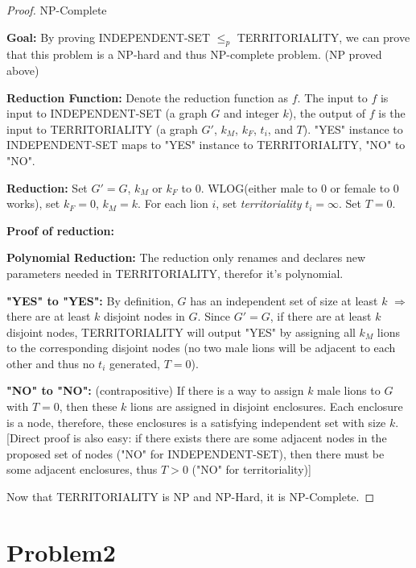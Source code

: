 \documentclass[openany]{article}
\begin{document}
\begin{proof}{NP-Complete}



\textbf{Goal:} By proving INDEPENDENT-SET $\leqslant_p$ TERRITORIALITY, we can prove that this problem is a NP-hard and thus NP-complete problem. (NP proved above)

\textbf{Reduction Function:} Denote the reduction function as $f$. The input to $f$ is input to INDEPENDENT-SET (a graph $G$ and integer $k$), the output of $f$ is the input to TERRITORIALITY (a graph $G'$, $k_M$, $k_F$, $t_i$, and $T$). "YES" instance to INDEPENDENT-SET maps to "YES" instance to TERRITORIALITY, "NO" to "NO". 

\textbf{Reduction:} Set $G' = G$, $k_M$ or $k_F$ to $0$. WLOG(either male to 0 or female to 0 works), set $k_F=0$, $k_M = k$. For each lion $i$, set \textit{territoriality} $t_i=\infty$. Set $T=0$. 

\textbf{Proof of reduction:}

\qquad \textbf{Polynomial Reduction:} The reduction only renames and declares new parameters needed in TERRITORIALITY, therefor it's polynomial.

\qquad \textbf{"YES" to "YES":} By definition, $G$ has an independent set of size at least $k$ $\Rightarrow$ there are at least $k$ disjoint nodes in $G$. Since $G' = G$, if there are at least $k$ disjoint nodes, TERRITORIALITY will output "YES" by assigning all $k_M$ lions to the corresponding disjoint nodes (no two male lions will be adjacent to each other and thus no $t_i$ generated, $T=0$).

\qquad \textbf{"NO" to "NO":} (contrapositive) If there is a way to assign $k$ male lions to $G$ with $T=0$, then these $k$ lions are assigned in disjoint enclosures. Each enclosure is a node, therefore, these enclosures is a satisfying independent set with size $k$. [Direct proof is also easy: if there exists there are some adjacent nodes in the proposed set of nodes ("NO" for INDEPENDENT-SET), then there must be some adjacent enclosures, thus $T>0$ ("NO" for territoriality)]


\qquad Now that TERRITORIALITY is NP and NP-Hard, it is NP-Complete.

\end{proof}

\section*{Problem2}
\end{document}
